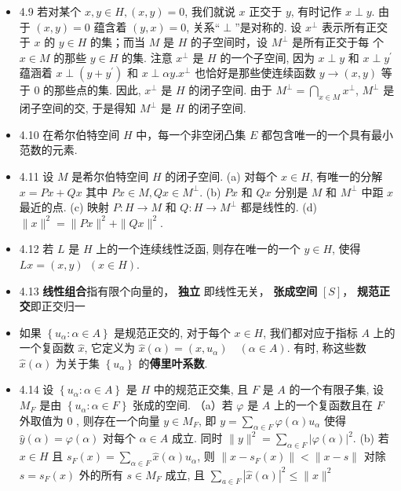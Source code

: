 \begin{itemize}
\item 4.9 若对某个 $x,y \in H,(x, y)=0$, 我们就说 $x$ 正交于 $y$, 有时记作 $x \perp y$. 由于 $(x, y)=0$ 蕴含着 $(y, x)=0$, 关系“$\perp$”是对称的. 设 $x^{\perp}$ 表示所有正交于 $x$ 的 $y \in H$ 的集；而当 $M$ 是 $H$ 的子空间时，设 $M^{\perp}$ 是所有正交于每 个 $x \in M$ 的那些 $y \in H$ 的集. 注意 $x^{\perp}$ 是 $H$ 的一个子空间, 因为 $x \perp y$ 和 $x \perp y^{\prime}$ 蕴涵着 $x \perp\left(y+y^{\prime}\right)$ 和 $x \perp \alpha y . x^{\perp}$ 也恰好是那些使连续函数 $y \rightarrow(x, y)$ 等于 0 的那些点的集. 因此, $x^{\perp}$ 是 $H$ 的闭子空间. 由于 $M^{\perp}=\bigcap_{x \in M} x^{\perp}$, $M^{\perp}$ 是闭子空间的交, 于是得知 $M^{\perp}$ 是 $H$ 的闭子空间.

\item 4.10 在希尔伯特空间 $H$ 中，每一个非空闭凸集 $E$ 都包含唯一的一个具有最小范数的元素.

\item 4.11 设 $M$ 是希尔伯特空间 $H$ 的闭子空间. (a) 对每个 $x \in H$, 有唯一的分解 $x=P x+Q x$ 其中 $P x \in M, Q x \in M^{\perp}$. (b) $P x$ 和 $Q x$ 分别是 $M$ 和 $M^{\perp}$ 中距 $x$ 最近的点. (c) 映射 $P: H \rightarrow M$ 和 $Q: H \rightarrow M^{\perp}$ 都是线性的. (d) $\|x\|^{2}=\|P x\|^{2}+\|Q x\|^{2}$.

\item 4.12 若 $L$ 是 $H$ 上的一个连续线性泛函, 则存在唯一的一个 $y \in H$, 使得 $L x=(x, y)\ \ (x \in H)$.

\item 4.13 \textbf{线性组合}指有限个向量的， \textbf{独立} 即线性无关， \textbf{张成空间} $[S]$， \textbf{规范正交}即正交归一

\item 如果 $\left\{u_{\alpha}: \alpha \in A\right\}$ 是规范正交的, 对于每个 $x \in H$, 我们都对应于指标 $A$ 上的一个复函数 $\hat{x}$, 它定义为 $\hat{x}(\alpha)=\left(x, u_{\alpha}\right) \quad(\alpha \in A)$. 有时, 称这些数 $\hat{x}(\alpha)$ 为关于集 $\left\{u_{\alpha}\right\}$ 的\textbf{傅里叶系数}.

\item 4.14 设 $\left\{u_{\alpha}: \alpha \in A\right\}$ 是 $H$ 中的规范正交集, 且 $F$ 是 $A$ 的一个有限子集, 设 $M_{F}$ 是由 $\left\{u_{\alpha}: \alpha \in F\right\}$ 张成的空间.
（a）若 $\varphi$ 是 $A$ 上的一个复函数且在 $F$ 外取值为 0 , 则存在一个向量 $y \in M_{F}$, 即 $y =\sum_{\alpha \in F} \varphi(\alpha) u_{\alpha}$ 使得 $\hat y(\alpha)=\varphi(\alpha)$ 对每个 $\alpha \in A$ 成立. 同时 $\|y\|^{2} =\sum_{\alpha \in F}|\varphi(\alpha)|^{2}$.
(b) 若 $x \in H$ 且 $s_{F}(x)=\sum_{\alpha \in F} \hat{x}(\alpha) u_{\alpha}$, 则 $\left\|x-s_{F}(x)\right\|<\|x-s\|$ 对除 $s=s_{F}(x)$ 外的所有 $s \in M_{F}$ 成立, 且 $\sum_{a \in F}|\hat{x}(\alpha)|^{2} \leqslant\|x\|^{2}$


\end{itemize}
